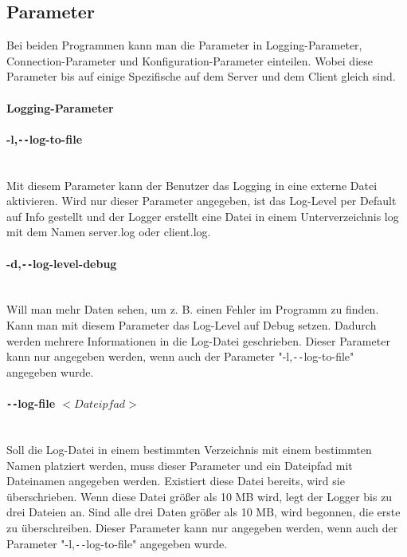 \subsection{Parameter}
Bei beiden Programmen kann man die Parameter in Logging-Parameter, Connection-Parameter und Konfiguration-Parameter einteilen. Wobei diese Parameter bis auf einige Spezifische auf dem Server und dem Client gleich sind.

\paragraph{Logging-Parameter}

\paragraph{-l,\texttt{-{}-}log-to-file} \mbox{} \vspace{2mm} \\
Mit diesem Parameter kann der Benutzer das Logging in eine externe Datei aktivieren. Wird nur dieser Parameter angegeben, ist das Log-Level per Default auf Info gestellt und der Logger erstellt eine Datei in einem Unterverzeichnis log mit dem Namen server.log oder client.log.

\paragraph{-d,\texttt{-{}-}log-level-debug} \mbox{} \vspace{2mm} \\
Will man mehr Daten sehen, um z. B. einen Fehler im Programm zu finden. Kann man mit diesem Parameter das Log-Level auf Debug setzen. Dadurch werden mehrere Informationen in die Log-Datei geschrieben. Dieser Parameter kann nur angegeben werden, wenn auch der Parameter "-l,\texttt{-{}-}log-to-file" angegeben wurde.

\paragraph{\texttt{-{}-}log-file $<Dateipfad>$} \mbox{} \vspace{2mm} \\
Soll die Log-Datei in einem bestimmten Verzeichnis mit einem bestimmten Namen platziert werden, muss dieser Parameter und ein Dateipfad mit Dateinamen angegeben werden. Existiert diese Datei bereits, wird sie überschrieben. Wenn diese Datei größer als 10 MB wird, legt der Logger bis zu drei Dateien an. Sind alle drei Daten größer als 10 MB, wird begonnen, die erste zu überschreiben. Dieser Parameter kann nur angegeben werden, wenn auch der Parameter "-l,\texttt{-{}-}log-to-file" angegeben wurde.

